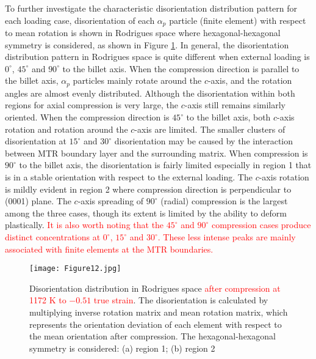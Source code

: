\documentclass[review]{elsarticle}
\begin{document}
		To further investigate the characteristic disorientation distribution pattern for each loading case, disorientation of each $\alpha_p$ particle (finite element) with respect to mean rotation is shown in Rodrigues space where hexagonal-hexagonal symmetry is considered, as shown in Figure \ref{fig:12}.
		In general, the disorientation distribution pattern in Rodrigues space is quite different when external loading is $0^{\circ}$, $45^{\circ}$ and $90^{\circ}$ to the billet axis.
		When the compression direction is parallel to the billet axis, $\alpha_p$ particles mainly rotate around the $c$-axis, and the rotation angles are almost evenly distributed.
		Although the disorientation within both regions for axial compression is very large, the $c$-axis still remains similarly oriented.
		When the compression direction is $45^{\circ}$ to the billet axis, both $c$-axis rotation and rotation around the $c$-axis are limited.
		The smaller clusters of disorientation at $15^{\circ}$ and $30^{\circ}$ disorientation may be caused by the interaction between MTR boundary layer and the surrounding matrix.
		When compression is $90^{\circ}$ to the billet axis, the disorientation is fairly limited especially in region 1 that is in a stable orientation with respect to the external loading.
		The $c$-axis rotation is mildly evident in region 2 where compression direction is perpendicular to (0001) plane.
		The $c$-axis spreading of $90^{\circ}$ (radial) compression is the largest among the three cases, though its extent is limited by the ability to deform plastically.
		\textcolor{red}{It is also worth noting that the $45^{\circ}$ and $90^{\circ}$ compression cases produce distinct concentrations at $0^{\circ}$, $15^{\circ}$ and $30^{\circ}$.
		These less intense peaks are mainly associated with finite elements at the MTR boundaries.}
		\begin{figure}[!htb]
		\centering
		\texttt{[image: Figure12.jpg]}
		\caption{\label{fig:12}Disorientation distribution in Rodrigues space \textcolor{red}{after compression at 1172 K to $-0.51$ true strain}.
		The disorientation is calculated by multiplying inverse rotation matrix and mean rotation matrix, which represents the orientation deviation of each element with respect to the mean orientation after compression.
		The hexagonal-hexagonal symmetry is considered: (a) region 1; (b) region 2}
		\end{figure}
\end{document}
